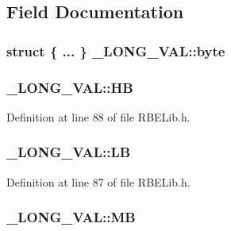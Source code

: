 \subsection{Field Documentation}
\hypertarget{union___l_o_n_g___v_a_l_a1411f938ce42e7abc1f134b5e1cd3ae1}{
\subsubsection[{byte}]{\setlength{\rightskip}{0pt plus 5cm}struct \{ ... \}   \+\_\+\+L\+O\+N\+G\+\_\+\+V\+A\+L\+::byte}}\label{union___l_o_n_g___v_a_l_a1411f938ce42e7abc1f134b5e1cd3ae1}
\hypertarget{union___l_o_n_g___v_a_l_a492ab3cb9e3bbe11a221ea77410a5f88}{
\subsubsection[{H\+B}]{ \+\_\+\+L\+O\+N\+G\+\_\+\+V\+A\+L\+::\+H\+B}}\label{union___l_o_n_g___v_a_l_a492ab3cb9e3bbe11a221ea77410a5f88}


Definition at line 88 of file R\+B\+E\+Lib.\+h.

\hypertarget{union___l_o_n_g___v_a_l_a77e3b8990039140ed51ddff049575677}{
\subsubsection[{L\+B}]{ \+\_\+\+L\+O\+N\+G\+\_\+\+V\+A\+L\+::\+L\+B}}\label{union___l_o_n_g___v_a_l_a77e3b8990039140ed51ddff049575677}


Definition at line 87 of file R\+B\+E\+Lib.\+h.

\hypertarget{union___l_o_n_g___v_a_l_a07a5aefc755b568368bb25d583b5c478}{
\subsubsection[{M\+B}]{ \+\_\+\+L\+O\+N\+G\+\_\+\+V\+A\+L\+::\+M\+B}}\label{union___l_o_n_g___v_a_l_a07a5aefc755b568368bb25d583b5c478}


